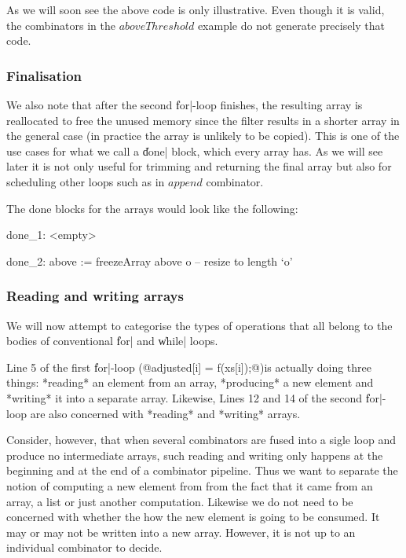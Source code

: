 \documentclass[preamble.tex]{subfiles}
\begin{document}
As we will soon see the above code is only illustrative. Even though it is valid, the combinators in the $aboveThreshold$ example do not generate precisely that code.

\subsubsection{Finalisation}
We also note that after the second \|for|-loop finishes, the resulting array is reallocated to free the unused memory since the filter results in a shorter array in the general case (in practice the array is unlikely to be copied). This is one of the use cases for what we call a \|done| block, which every array has. As we will see later it is not only useful for trimming and returning the final array but also for scheduling other loops such as in $append$ combinator.

The done blocks for the arrays would look like the following:

\begin{loopcode}
  done_1:
    <empty>

  done_2:
    above := freezeArray above o  -- resize to length `o'
\end{loopcode}

\subsubsection{Reading and writing arrays}
We will now attempt to categorise the types of operations that all belong to the bodies of conventional \|for| and \|while| loops.

Line 5 of the first \|for|-loop (@adjusted[i] = f(xs[i]);@)is actually doing three things: *reading* an element from an array, *producing* a new element and *writing* it into a separate array. Likewise, Lines 12 and 14 of the second \|for|-loop are also concerned with *reading* and *writing* arrays.

Consider, however, that when several combinators are fused into a sigle loop and produce no intermediate arrays, such reading and writing only happens at the beginning and at the end of a combinator pipeline. Thus we want to separate the notion of computing a new element from from the fact that it came from an array, a list or just another computation. Likewise we do not need to be concerned with whether the how the new element is going to be consumed. It may or may not be written into a new array. However, it is not up to an individual combinator to decide.
\end{document}

